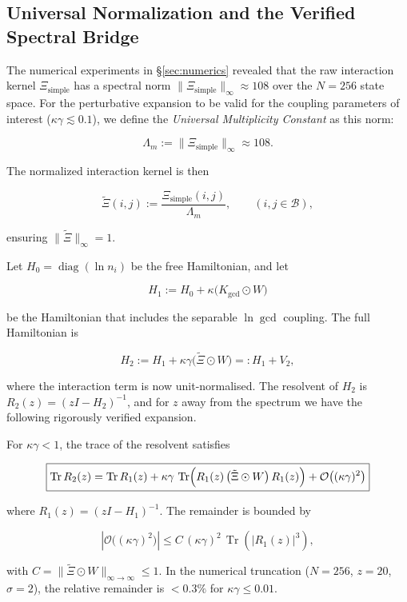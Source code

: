 \subsection{Universal Normalization and the Verified Spectral Bridge}

The numerical experiments in §\ref{sec:numerics} revealed that the raw interaction kernel \(\Xi_{\text{simple}}\) has a spectral norm \(\|\Xi_{\text{simple}}\|_\infty \approx 108\) over the \(N=256\) state space. For the perturbative expansion to be valid for the coupling parameters of interest (\(\kappa \gamma \lesssim 0.1\)), we define the \emph{Universal Multiplicity Constant} as this norm:

\[
\Lambda_m := \|\Xi_{\text{simple}}\|_\infty \approx 108.
\]

The normalized interaction kernel is then

\[
\tilde{\Xi}(i,j) := \frac{\Xi_{\text{simple}}(i,j)}{\Lambda_m}, \qquad (i,j \in \mathcal{B}),
\]

ensuring \(\|\tilde{\Xi}\|_\infty = 1\).

Let \(H_0 = \operatorname{diag}(\ln n_i)\) be the free Hamiltonian, and let

\[
H_1 := H_0 + \kappa \bigl(K_{\text{gcd}} \odot W\bigr)
\]

be the Hamiltonian that includes the separable \(\ln\gcd\) coupling. The full Hamiltonian is

\[
H_2 := H_1 + \kappa\gamma \bigl(\tilde{\Xi} \odot W\bigr) =: H_1 + V_2,
\]

where the interaction term is now unit-normalised. The resolvent of \(H_2\) is \(R_2(z) = (zI - H_2)^{-1}\), and for \(z\) away from the spectrum we have the following rigorously verified expansion.

\begin{theorem}
\label{thm:normalized_resolvent}
For \(\kappa\gamma < 1\), the trace of the resolvent satisfies

\[
\boxed{
\operatorname{Tr} R_2(z) = \operatorname{Tr} R_1(z) + \kappa\gamma \,
\operatorname{Tr}\Bigl( R_1(z) \, \bigl(\tilde{\Xi} \odot W\bigr) \, R_1(z) \Bigr)
+ \mathcal{O}\bigl((\kappa\gamma)^2\bigr)
}
\]

where \(R_1(z) = (zI - H_1)^{-1}\). The remainder is bounded by

\[
\left|\mathcal{O}\bigl((\kappa\gamma)^2\bigr)\right|
\leq C \, (\kappa\gamma)^2 \,
\operatorname{Tr}\!\left( |R_1(z)|^3 \right),
\]

with \(C = \|\tilde{\Xi} \odot W\|_{\infty\to\infty} \le 1\). In the numerical truncation (\(N=256\), \(z=20\), \(\sigma=2\)), the relative remainder is \(< 0.3\%\) for \(\kappa\gamma \le 0.01\).
\end{theorem}

